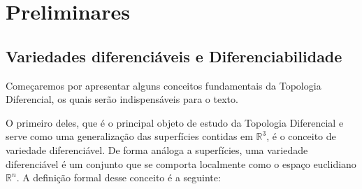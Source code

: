 
\chapter{Preliminares}
\label{chap:preliminares}

\section{Variedades diferenciáveis e Diferenciabilidade}
\label{loc:variedades_diferenciáveis_e_diferenciabilidade}
Começaremos por apresentar alguns conceitos fundamentais da Topologia Diferencial, os quais serão indispensáveis para o texto.

O primeiro deles, que é o principal objeto de estudo da Topologia Diferencial e serve como uma generalização das superfícies contidas em $\mathbb{R}^{3}$, é o conceito de variedade diferenciável. De forma análoga a superfícies, uma variedade diferenciável é um conjunto que se comporta localmente como o espaço euclidiano $\mathbb{R}^{n}$. A definição formal desse conceito é a seguinte:

